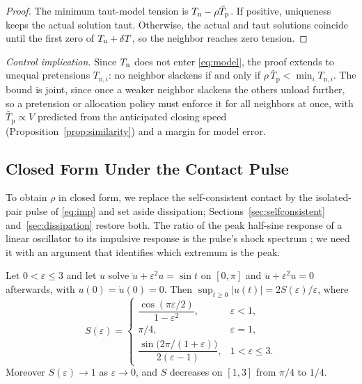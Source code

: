 \begin{proof}
The minimum taut-model tension is $T_{\mathrm{n}}-\rho\bar T_{\mathrm p}$. If positive, uniqueness keeps the actual solution taut. Otherwise, the actual and taut solutions coincide until the first zero of $T_{\mathrm{n}}+\delta T$, so the neighbor reaches zero tension.
\end{proof}

\noindent\textit{Control implication.}
Since $T_{\mathrm{n}}$ does not enter \eqref{eq:model}, the proof extends to unequal pretensions $T_{\mathrm{n},i}$: no neighbor slackens if and only if $\rho\,\bar T_{\mathrm p}<\min_i T_{\mathrm{n},i}$. The bound is joint, since once a weaker neighbor slackens the others unload further, so a pretension or allocation policy must enforce it for all neighbors at once, with $\bar T_{\mathrm p}\propto V$ predicted from the anticipated closing speed (Proposition~\ref{prop:similarity}) and a margin for model error.

\subsection{Closed Form Under the Contact Pulse}\label{sec:closedform}

To obtain $\rho$ in closed form, we replace the self-consistent contact by the isolated-pair pulse of \eqref{eq:imp} and set aside dissipation; Sections~\ref{sec:selfconsistent} and~\ref{sec:dissipation} restore both. The ratio of the peak half-sine response of a linear oscillator to its impulsive response is the pulse's shock spectrum \cite{harris2002shock}; we need it with an argument that identifies which extremum is the peak.

\begin{lemma}\label{lem:spectrum}
Let $0<\varepsilon\le 3$ and let $u$ solve $\ddot u+\varepsilon^2u=\sin t$ on $[0,\pi]$ and $\ddot u+\varepsilon^2u=0$ afterwards, with $u(0)=\dot u(0)=0$. Then $\sup_{t\ge0}|u(t)| = 2S(\varepsilon)/\varepsilon$, where
\begin{equation}\label{eq:spectrum}
  S(\varepsilon) =
  \begin{cases}
    \dfrac{\cos(\pi\varepsilon/2)}{1-\varepsilon^2}, & \varepsilon<1,\\[4pt]
    \pi/4, & \varepsilon = 1,\\[2pt]
    \dfrac{\sin\!\big(2\pi/(1+\varepsilon)\big)}{2(\varepsilon-1)}, & 1<\varepsilon\le 3.
  \end{cases}
\end{equation}
Moreover $S(\varepsilon)\to1$ as $\varepsilon\to0$, and $S$ decreases on $[1,3]$ from $\pi/4$ to $1/4$.
\end{lemma}

